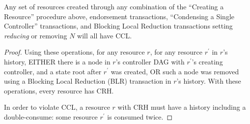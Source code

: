 \documentclass[a4paper,USenglish,cleveref, autoref, thm-restate, anonymous]{lipics-v2021}
\begin{document}
\begin{theorem}
    Any set of resources created through any combination of the ``Creating a Resource'' procedure above, endorsement transactions, ``Condensing a Single Controller'' transactions, and Blocking Local Reduction transactions setting \emph{reducing} or removing $N$ will all have CCL.
\end{theorem}
\begin{proof}
    Using these operations, for any resource $r$, for any resource $r^\prime$ in $r$'s history, EITHER there is a node in $r$'s controller DAG with $r^\prime$'s creating controller, and a state root after $r^\prime$ was created, OR such a node was removed using a Blocking Local Reduction (BLR) transaction in $r$'s history.
    With these operations, every resource has CRH.
    




   
   In order to violate CCL, a resource $r$ with CRH must have a history including a double-consume: some resource $r^\prime$ is consumed twice.









\end{proof}
\end{document}
